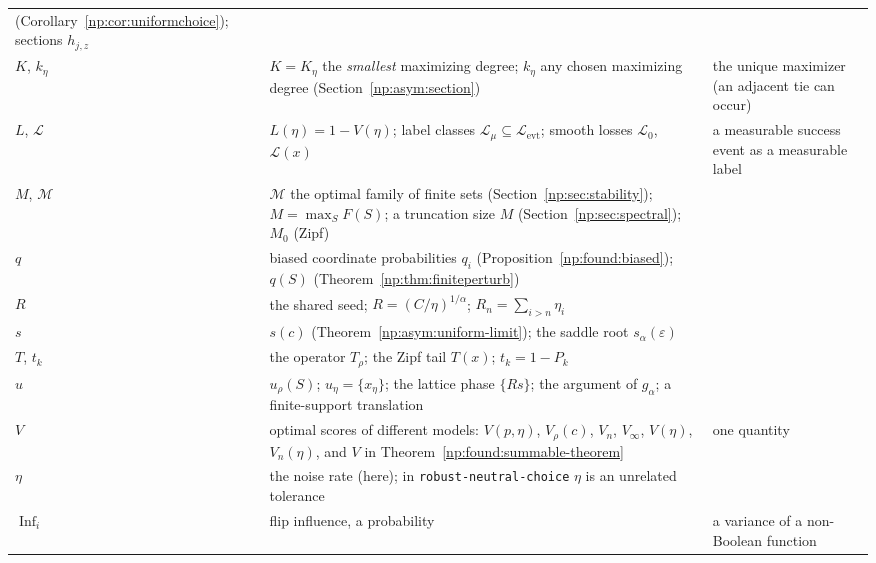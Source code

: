 \documentclass[11pt,a4paper]{article}
\theoremstyle{definition}
\theoremstyle{remark}
\newcommand{\Inf}{\operatorname{Inf}}
\newcommand{\file}[1]{\nolinkurl{#1}}
\begin{document}
{\begin{longtable}{@{}L{.13\textwidth}L{.50\textwidth}L{.28\textwidth}@{}}
 (Corollary~\ref{np:cor:uniformchoice}); sections $h_{j,z}$ & \\
$K$, $k_\eta$ & $K=K_\eta$ the \emph{smallest} maximizing degree;
 $k_\eta$ any chosen maximizing degree (Section~\ref{np:asym:section}) &
 the unique maximizer (an adjacent tie can occur)\\
$L$, $\mathcal L$ & $L(\eta)=1-V(\eta)$; label classes $\mathcal L_\mu
 \subseteq\mathcal L_{\mathrm{evt}}$; smooth losses $\mathcal L_0$,
 $\mathcal L(x)$ & a measurable success event as a measurable label\\
$M$, $\mathcal M$ & $\mathcal M$ the optimal family of finite sets
 (Section~\ref{np:sec:stability}); $M=\max_SF(S)$; a truncation size $M$
 (Section~\ref{np:sec:spectral}); $M_0$ (Zipf) & \\
$q$ & biased coordinate probabilities $q_i$
 (Proposition~\ref{np:found:biased}); $q(S)$
 (Theorem~\ref{np:thm:finiteperturb}) & \\
$R$ & the shared seed; $R=(C/\eta)^{1/\alpha}$; $R_n=\sum_{i>n}\eta_i$ & \\
$s$ & $s(c)$ (Theorem~\ref{np:asym:uniform-limit}); the saddle root
 $s_\alpha(\varepsilon)$ & \\
$T$, $t_k$ & the operator $T_\rho$; the Zipf tail $T(x)$; $t_k=1-P_k$ & \\
$u$ & $u_\rho(S)$; $u_\eta=\{x_\eta\}$; the lattice phase $\{Rs\}$; the
 argument of $g_\alpha$; a finite-support translation & \\
$V$ & optimal scores of different models: $V(p,\eta)$, $V_\rho(c)$, $V_n$,
 $V_\infty$, $V(\eta)$, $V_n(\eta)$, and $V$ in
 Theorem~\ref{np:found:summable-theorem} & one quantity\\
$\eta$ & the noise rate (here); in
 \file{robust-neutral-choice} $\eta$ is an unrelated tolerance & \\
$\Inf_i$ & flip influence, a probability & a variance of a
 non-Boolean function\\
\bottomrule
\end{longtable}}
\end{document}
